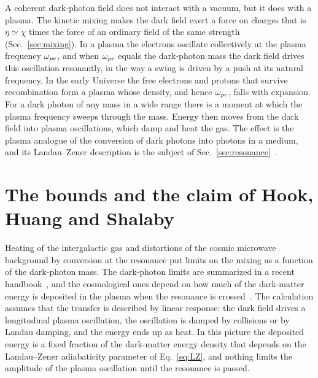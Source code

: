 A coherent dark-photon field does not interact with a vacuum, but it does with a plasma. The kinetic mixing makes the dark field exert a force on charges that is $\eta\simeq\chi$ times the force of an ordinary field of the same strength (Sec.~\ref{sec:mixing}). In a plasma the electrons oscillate collectively at the plasma frequency $\omega_{pe}$, and when $\omega_{pe}$ equals the dark-photon mass the dark field drives this oscillation resonantly, in the way a swing is driven by a push at its natural frequency. In the early Universe the free electrons and protons that survive recombination form a plasma whose density, and hence $\omega_{pe}$, falls with expansion. For a dark photon of any mass in a wide range there is a moment at which the plasma frequency sweeps through the mass. Energy then moves from the dark field into plasma oscillations, which damp and heat the gas. The effect is the plasma analogue of the conversion of dark photons into photons in a medium, and its Landau--Zener description is the subject of Sec.~\ref{sec:resonance}~\citep{Mirizzi2009,DubovskyHC2015,McDermottWitte2020}.

\section{The bounds and the claim of Hook, Huang and Shalaby}

Heating of the intergalactic gas and distortions of the cosmic microwave background by conversion at the resonance put limits on the mixing as a function of the dark-photon mass. The dark-photon limits are summarized in a recent handbook~\citep{CaputoHandbook2021}, and the cosmological ones depend on how much of the dark-matter energy is deposited in the plasma when the resonance is crossed~\citep{McDermottWitte2020,Witte2020}. The calculation assumes that the transfer is described by linear response: the dark field drives a longitudinal plasma oscillation, the oscillation is damped by collisions or by Landau damping, and the energy ends up as heat. In this picture the deposited energy is a fixed fraction of the dark-matter energy density that depends on the Landau--Zener adiabaticity parameter of Eq.~\eqref{eq:LZ}, and nothing limits the amplitude of the plasma oscillation until the resonance is passed.

